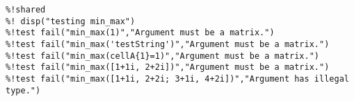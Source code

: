 \begin{verbatim}
%!shared
%! disp("testing min_max")
%!test fail("min_max(1)","Argument must be a matrix.")
%!test fail("min_max('testString')","Argument must be a matrix.")
%!test fail("min_max(cellA{1}=1)","Argument must be a matrix.")
%!test fail("min_max([1+1i, 2+2i])","Argument must be a matrix.")
%!test fail("min_max([1+1i, 2+2i; 3+1i, 4+2i])","Argument has illegal type.")
\end{verbatim}
